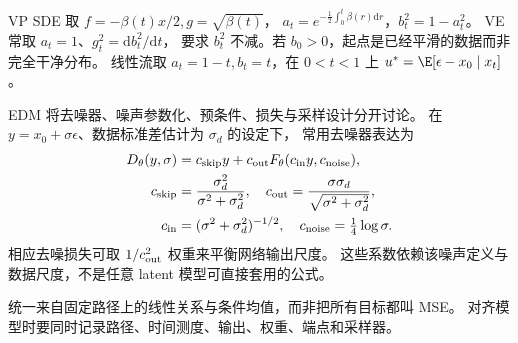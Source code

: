 VP SDE 取 $f=-\beta(t)x/2,g=\sqrt{\beta(t)}$，
$a_t=e^{-\frac12\int_0^t\beta(r)\mathrm dr}$，$b_t^2=1-a_t^2$。
VE 常取 $a_t=1$、$g_t^2=\mathrm d b_t^2/\mathrm dt$，
要求 $b_t^2$ 不减。若 $b_0>0$，起点是已经平滑的数据而非完全干净分布。
线性流取 $a_t=1-t,b_t=t$，在 $0<t<1$ 上
$u^*=\E[\epsilon-x_0\mid x_t]$。

EDM 将去噪器、噪声参数化、预条件、损失与采样设计分开讨论。
在 $y=x_0+\sigma\epsilon$、数据标准差估计为 $\sigma_d$ 的设定下，
常用去噪器表达为
\begin{align}
D_\theta(y,\sigma)&=c_{\rm skip}y+c_{\rm out}
 F_\theta(c_{\rm in}y,c_{\rm noise}),\\
c_{\rm skip}&=\frac{\sigma_d^2}{\sigma^2+\sigma_d^2},\quad
c_{\rm out}=\frac{\sigma\sigma_d}{\sqrt{\sigma^2+\sigma_d^2}},\\
c_{\rm in}&=(\sigma^2+\sigma_d^2)^{-1/2},\quad
c_{\rm noise}=\tfrac14\log\sigma.
\end{align}
相应去噪损失可取 $1/c_{\rm out}^2$ 权重来平衡网络输出尺度。
这些系数依赖该噪声定义与数据尺度，不是任意 latent 模型可直接套用的公式。

\begin{theorytakeaway}
统一来自固定路径上的线性关系与条件均值，而非把所有目标都叫 MSE。
对齐模型时要同时记录路径、时间测度、输出、权重、端点和采样器。
\end{theorytakeaway}
